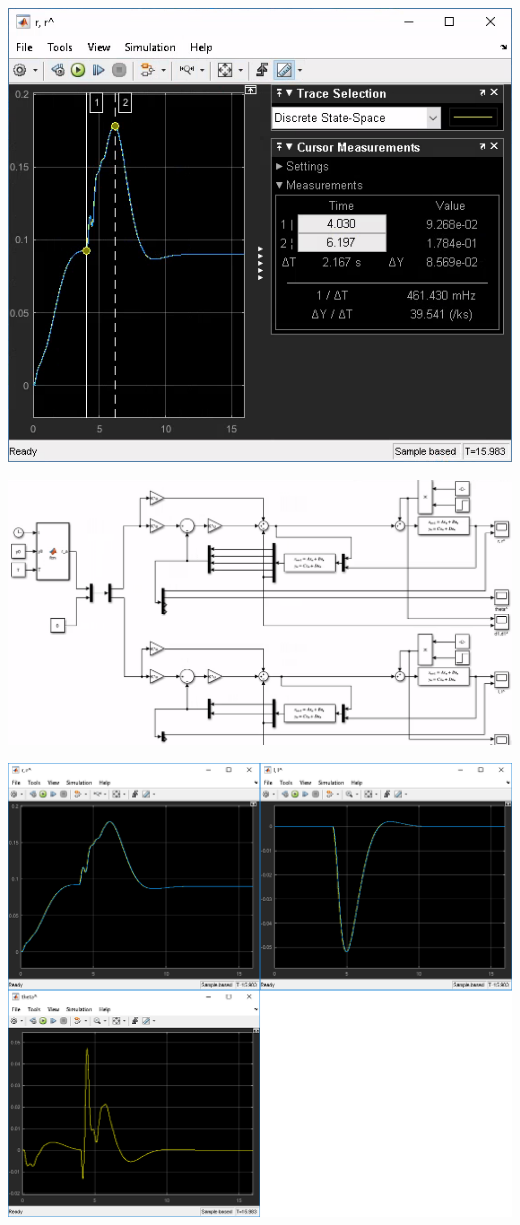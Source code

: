 \documentclass{article}
\begin{document}
    \begin{center}
        \includegraphics[width=\linewidth*2/3]{asset/diff.png}
    \end{center}

    \begin{minipage}{\linewidth}
        \includegraphics[width=\linewidth]{asset/rl2.png}
    \end{minipage}

    \begin{center}
        \includegraphics[width=\linewidth]{asset/result2.png}
    \end{center}
\end{document}
